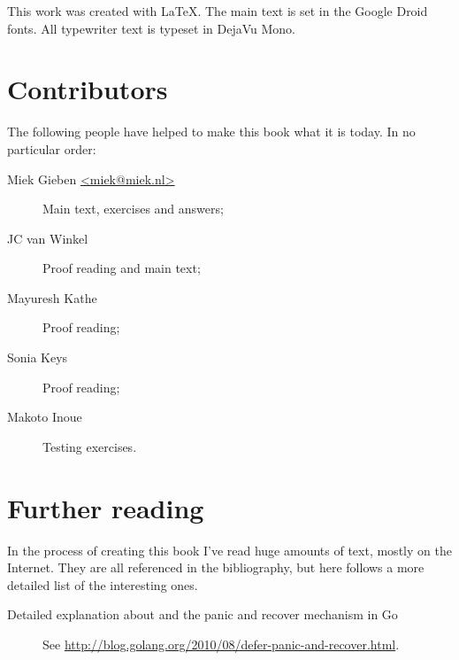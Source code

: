 \noindent{}This work was created with \LaTeX. The main text is set in
the Google Droid fonts. All typewriter text is typeset in DejaVu Mono.

\section{Contributors}
The following people have helped to make this book what it is today.
In no particular order:
\begin{description}
\item[Miek Gieben \qquad\url{<miek@miek.nl>}] 
{Main text, exercises and answers;}
\item[JC van Winkel]
{Proof reading and main text;}
\item[Mayuresh Kathe]
{Proof reading;}
\item[Sonia Keys]
{Proof reading;}
\item[Makoto Inoue]
{Testing exercises.}
\end{description}

\section{Further reading}
In the process of creating this book I've read huge amounts of text,
mostly on the Internet. They are all referenced in the bibliography, but
here follows a more detailed list of the interesting ones.
\begin{description}
\item[Detailed explanation about  and the panic and recover
mechanism in Go]{See 
\url{http://blog.golang.org/2010/08/defer-panic-and-recover.html}.}
\end{description}

